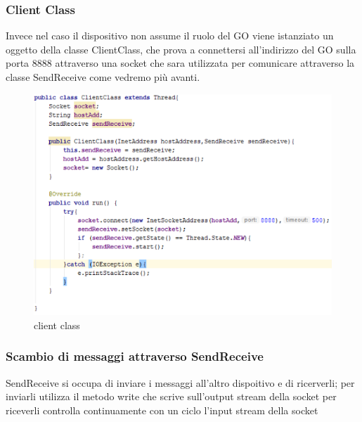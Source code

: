 \subsubsection{Client Class}
Invece nel caso il dispositivo non assume il ruolo del GO
viene istanziato un oggetto della classe ClientClass,
che prova a connettersi all'indirizzo del GO sulla porta 8888 attraverso
una socket che sara utilizzata per comunicare
attraverso la classe SendReceive come vedremo più avanti.
    
\begin{figure}
    \caption{client class}
    \includegraphics[width=0.7\columnwidth]{imgs/clientClass.png}
    \centering
\end{figure}


\subsubsection{Scambio di messaggi attraverso SendReceive}
SendReceive si occupa di inviare i messaggi all'altro dispoitivo 
e di ricerverli;
per inviarli utilizza il metodo write che scrive 
sull'output stream della socket
per riceverli controlla continuamente con un ciclo l'input stream
della socket


